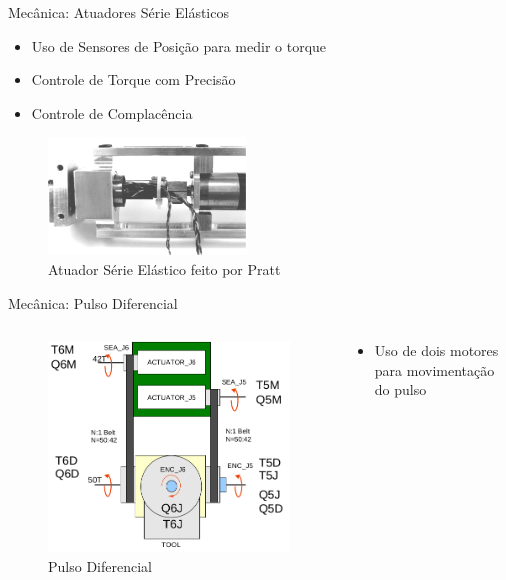 \documentclass{beamer}
\begin{document}
\begin{frame}{Mecânica: Atuadores Série Elásticos}
\begin{itemize}
    \item Uso de Sensores de Posição para medir o torque
    \item Controle de Torque com Precisão
    \item Controle de Complacência
\end{itemize}
\begin{figure}
    \centering
    \includegraphics[width = 0.6\linewidth]{tex/figs/sea_pratt.png}
    \caption{Atuador Série Elástico feito por Pratt}
    \label{fig:mekainside}
\end{figure}
\end{frame}

\begin{frame}{Mecânica: Pulso Diferencial}
\begin{columns}
\begin{column}{0.6\textwidth}
\begin{figure}
    \centering
    \includegraphics[width = 0.6\linewidth]{tex/figs/meka_wrist.png}
    \caption{Pulso Diferencial}
    \label{fig:m3arch}
\end{figure}
\end{column}
\begin{column}{0.4\textwidth}  %
\begin{itemize}
    \item Uso de dois motores para movimentação do pulso
\end{itemize}
\end{column}
\end{columns}
\end{frame}
\end{document}

